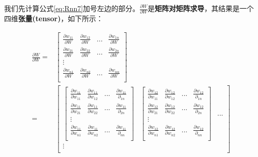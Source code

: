 我们先计算公式\ref{eq:Rnn7}加号左边的部分。\(\frac{\partial{W}}{\partial{W}}\)是\textbf{矩阵对矩阵求导}，其结果是一个四维\textbf{张量(tensor)}，如下所示：

\begin{align*}
	\frac{\partial{W}}{\partial{W}}= &
	\begin{bmatrix}
		\frac{\partial{w_{11}}}{\partial{W}} & \frac{\partial{w_{12}}}{\partial{W}} & ... & \frac{\partial{w_{1n}}}{\partial{W}} \\
		\frac{\partial{w_{21}}}{\partial{W}} & \frac{\partial{w_{22}}}{\partial{W}} & ... & \frac{\partial{w_{2n}}}{\partial{W}} \\\vdots \\
		\frac{\partial{w_{n1}}}{\partial{W}} & \frac{\partial{w_{n2}}}{\partial{W}} & ... & \frac{\partial{w_{nn}}}{\partial{W}} \\
	\end{bmatrix}         \\
	=                                &
	\begin{bmatrix}
		\begin{bmatrix}
			\frac{\partial{w_{11}}}{\partial{w_{11}}} & \frac{\partial{w_{11}}}{\partial{w_{12}}} & ... & \frac{\partial{w_{11}}}{\partial{_{1n}}} \\
			\frac{\partial{w_{11}}}{\partial{w_{21}}} & \frac{\partial{w_{11}}}{\partial{w_{22}}} & ... & \frac{\partial{w_{11}}}{\partial{_{2n}}} \\\vdots\\
			\frac{\partial{w_{11}}}{\partial{w_{n1}}} & \frac{\partial{w_{11}}}{\partial{w_{n2}}} & ... & \frac{\partial{w_{11}}}{\partial{_{nn}}} \\
		\end{bmatrix} &
		\begin{bmatrix}
			\frac{\partial{w_{12}}}{\partial{w_{11}}} & \frac{\partial{w_{12}}}{\partial{w_{12}}} & ... & \frac{\partial{w_{12}}}{\partial{_{1n}}} \\
			\frac{\partial{w_{12}}}{\partial{w_{21}}} & \frac{\partial{w_{12}}}{\partial{w_{22}}} & ... & \frac{\partial{w_{12}}}{\partial{_{2n}}} \\\vdots\\
			\frac{\partial{w_{12}}}{\partial{w_{n1}}} & \frac{\partial{w_{12}}}{\partial{w_{n2}}} & ... & \frac{\partial{w_{12}}}{\partial{_{nn}}} \\
		\end{bmatrix} & ... \\\vdots\\
	\end{bmatrix}         \\

\end{align*}
